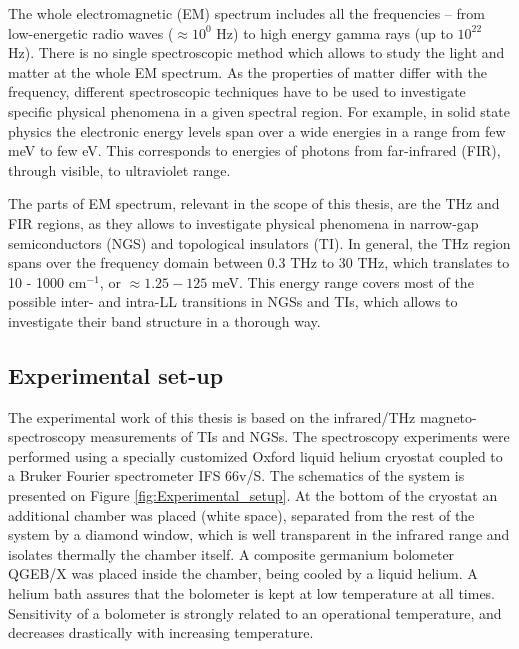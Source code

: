 \documentclass[titlepage,a4paper]{book}
\newcommand{\wciecie}{\quad\phantom{v}}
\begin{document}
The whole electromagnetic (EM) spectrum includes all the frequencies -- from low-energetic radio waves ($\approx 10^0$ Hz) to high energy gamma rays (up to $10^{22}$ Hz). There is no single spectroscopic method which allows to study the light and matter at the whole EM spectrum. As the properties of matter differ with the frequency, different spectroscopic techniques have to be used to investigate specific physical phenomena in a given spectral region. For example, in solid state physics the electronic energy levels span over a wide energies in a range from few meV to few eV. This corresponds to energies of photons from far-infrared (FIR), through visible, to ultraviolet range.

The parts of EM spectrum, relevant in the scope of this thesis, are the THz and FIR regions, as they allows to investigate physical phenomena in narrow-gap semiconductors (NGS) and topological insulators (TI). In general, the THz region spans over the frequency domain between 0.3 THz to 30 THz, which translates to 10 - 1000 cm$^{-1}$, or $\approx 1.25 - 125$ meV. This energy range covers most of the possible inter- and intra-LL transitions in NGSs and TIs, which allows to investigate their band structure in a thorough way.  

\subsection{Experimental set-up}
\wciecie
The experimental work of this thesis is based on the infrared/THz magneto-spectroscopy measurements of TIs and NGSs. The spectroscopy experiments were performed using a specially customized Oxford liquid helium cryostat coupled to a Bruker Fourier spectrometer IFS 66v/S. The schematics of the system is presented on Figure \ref{fig:Experimental_setup}. At the bottom of the cryostat an additional chamber was placed (white space), separated from the rest of the system by a diamond window, which is well transparent in the infrared range and isolates thermally the chamber itself. A composite germanium bolometer QGEB/X was placed inside the chamber, being cooled by a liquid helium. A helium bath assures that the bolometer is kept at low temperature at all times. Sensitivity of a bolometer is strongly related to an operational temperature, and decreases drastically with increasing temperature. 
\end{document}
